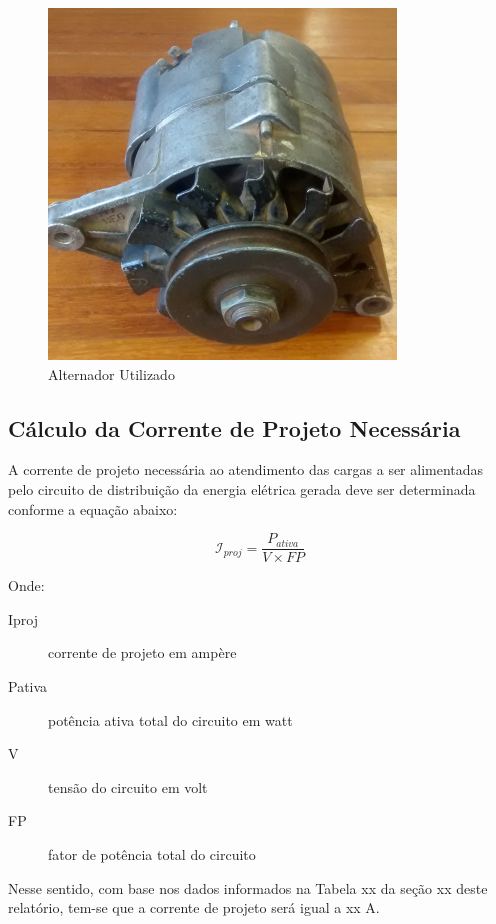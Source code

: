 \begin{figure}[h]
	\centering
	\includegraphics[scale=0.8]		{figuras/alternador.png}
	\caption{Alternador Utilizado}
	\label{alternador}
\end{figure}

\subsection{Cálculo da Corrente de Projeto Necessária}

A corrente de projeto necessária ao atendimento das cargas a ser alimentadas pelo circuito de distribuição da energia elétrica gerada deve ser determinada conforme a equação abaixo:

\begin{equation}
	\mathcal{I}_{proj} = \frac{{P}_{ativa}}{V \times FP}
\end{equation}

Onde:
\begin{description}

\item [Iproj] corrente de projeto em ampère

\item [Pativa] potência ativa total do circuito em watt

\item [V] tensão do circuito em volt

\item [FP] fator de potência total do circuito
\end{description}

Nesse sentido, com base nos dados informados na Tabela xx da seção xx deste relatório, tem-se que a corrente de projeto será igual a xx A.

